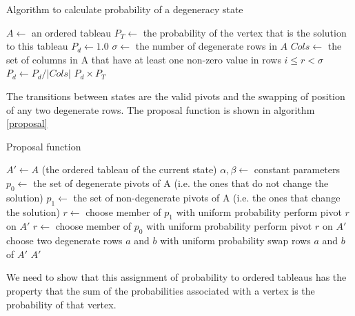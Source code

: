 \documentclass{article}
\begin{document}
\begin{algorithm}
\caption{Algorithm to calculate probability of a degeneracy state}
\label{probAlgorithm}
\begin{algorithmic}
\State $A \leftarrow$ an ordered tableau
\State $P_T \leftarrow$ the probability of the vertex that is the solution to this tableau
\State $P_d \leftarrow 1.0$
\State $\sigma \leftarrow$ the number of degenerate rows in $A$
	\State $Cols \leftarrow$ the set of columns in A that have at least one non-zero value in rows $i \le r < \sigma$
	\State $P_d \leftarrow P_d/|Cols|$
\EndFor
\State \Return $P_d \times P_T$
\end{algorithmic}
\end{algorithm}

The transitions between states are the valid pivots and the swapping of position of any two degenerate rows. The proposal function is shown in algorithm \ref{proposal}

\begin{algorithm}
\caption{Proposal function}
\label{proposal}
\begin{algorithmic}
\State $A' \leftarrow A$ (the ordered tableau of the current state)
\State $\alpha, \beta \leftarrow$ constant parameters
\State $p_0 \leftarrow$ the set of degenerate pivots of A (i.e. the ones that do not change the solution)
\State $p_1 \leftarrow$ the set of non-degenerate pivots of A (i.e. the ones that change the solution)
  \State $r \leftarrow$ choose member of $p_1$ with uniform probability
  \State perform pivot $r$ on $A'$
  \State $r \leftarrow$ choose member of $p_0$ with uniform probability
  \State perform pivot $r$ on $A'$
\Else
  \State choose two degenerate rows $a$ and $b$ with uniform probability
  \State swap rows $a$ and $b$ of $A'$ 
\EndIf
\State \Return $A'$
\EndFunction
\end{algorithmic}
\end{algorithm}

We need to show that this assignment of probability to ordered tableaus has the property that the sum of the probabilities associated with a vertex is the probability of that vertex.
\end{document}
